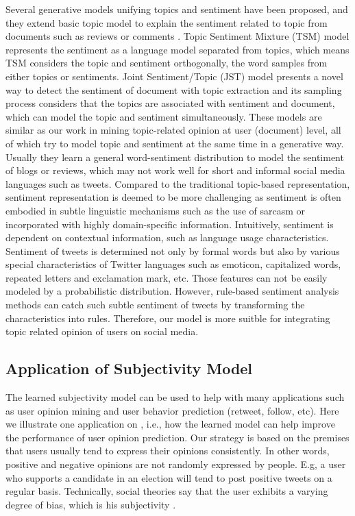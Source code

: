 \begin{landscape}
Several generative models unifying topics and sentiment have been proposed, and they extend basic topic model to explain the sentiment related to topic from documents such as reviews or comments \cite{mei2007topic,lin2009joint}. Topic Sentiment Mixture (TSM) model \cite{mei2007topic} represents the sentiment as a language model separated from topics, which means TSM considers the topic and sentiment orthogonally, the word samples from either topics or sentiments. Joint Sentiment/Topic (JST) model \cite{lin2009joint} presents a novel way to detect the sentiment of document with topic extraction and its sampling process considers that the topics are associated with sentiment and document, which can model the topic and sentiment simultaneously. These models are similar as our work in mining topic-related opinion at user (document) level, all of which try to model topic and sentiment at the same time in a generative way. Usually they learn a general word-sentiment distribution to model the sentiment of blogs or reviews, which may not work well for short and informal social media languages such as tweets. Compared to the traditional topic-based representation, sentiment representation is deemed to be more challenging as sentiment is often embodied in subtle linguistic mechanisms such as the use of sarcasm or incorporated with highly domain-specific information. Intuitively, sentiment is dependent on contextual information, such as language usage characteristics. Sentiment of tweets is determined not only by formal words but also by various special characteristics of Twitter languages such as emoticon, capitalized words, repeated letters and exclamation mark, etc. Those features can not be easily modeled by a probabilistic distribution.  However, rule-based sentiment analysis methods can catch such subtle sentiment of tweets by transforming the characteristics into rules. Therefore, our model is more suitble for integrating topic related opinion of users on social media. 

\subsection{Application of Subjectivity Model}
\label{application}

The learned subjectivity model can be used to help with many applications such as user opinion mining and user behavior prediction (retweet, follow, etc). Here we illustrate one application on , i.e., how the learned model can help improve the performance of user opinion prediction.
Our strategy is based on the premises that users usually tend to express their opinions consistently. In other words, positive and negative opinions are not randomly expressed by people. E.g, a user who supports a candidate in an election will tend to post positive tweets on a regular basis. Technically, social theories say that the user exhibits a varying degree of bias, which is his subjectivity \cite{walton1991bias}. 


\end{landscape}
